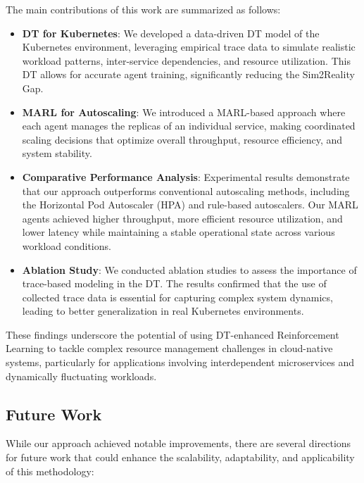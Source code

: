 \documentclass[conference]{IEEEtran}
\begin{document}
The main contributions of this work are summarized as follows:
\begin{itemize}
    \item \textbf{DT for Kubernetes}: We developed a data-driven DT model of the Kubernetes environment, leveraging empirical trace data to simulate realistic workload patterns, inter-service dependencies, and resource utilization. This DT allows for accurate agent training, significantly reducing the Sim2Reality Gap.
    \item \textbf{MARL for Autoscaling}: We introduced a MARL-based approach where each agent manages the replicas of an individual service, making coordinated scaling decisions that optimize overall throughput, resource efficiency, and system stability.
    \item \textbf{Comparative Performance Analysis}: Experimental results demonstrate that our approach outperforms conventional autoscaling methods, including the Horizontal Pod Autoscaler (HPA) and rule-based autoscalers. Our MARL agents achieved higher throughput, more efficient resource utilization, and lower latency while maintaining a stable operational state across various workload conditions.
    \item \textbf{Ablation Study}: We conducted ablation studies to assess the importance of trace-based modeling in the DT. The results confirmed that the use of collected trace data is essential for capturing complex system dynamics, leading to better generalization in real Kubernetes environments.
\end{itemize}

These findings underscore the potential of using DT-enhanced Reinforcement Learning to tackle complex resource management challenges in cloud-native systems, particularly for applications involving interdependent microservices and dynamically fluctuating workloads.

\subsection{Future Work}

While our approach achieved notable improvements, there are several directions for future work that could enhance the scalability, adaptability, and applicability of this methodology:
\end{document}
